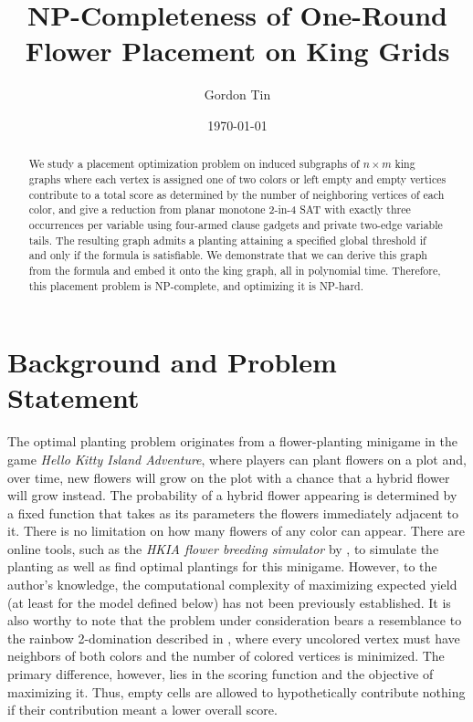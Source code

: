 \documentclass[11pt]{article}
\title{NP-Completeness of One-Round Flower Placement on King Grids}
\author{Gordon Tin}
\date{\today}
\theoremstyle{plain}
\begin{document}
\maketitle

\begin{abstract}
We study a placement optimization problem on induced subgraphs of $n \times m$ king graphs where each vertex is assigned one of two colors or left empty and empty vertices contribute to a total score as determined by the number of neighboring vertices of each color, and give a reduction from planar monotone 2-in-4 SAT with exactly three occurrences per variable using four-armed clause gadgets and private two-edge variable tails. The resulting graph admits a planting attaining a specified global threshold if and only if the formula is satisfiable. We demonstrate that we can derive this graph from the formula and embed it onto the king graph, all in polynomial time. Therefore, this placement problem is NP-complete, and optimizing it is NP-hard. 
\end{abstract}

\section{Background and Problem Statement} \label{sec:probstatement}

The optimal planting problem originates from a flower-planting minigame in the game \emph{Hello Kitty Island Adventure}, where players can plant flowers on a plot and, over time, new flowers will grow on the plot with a chance that a hybrid flower will grow instead. The probability of a hybrid flower appearing is determined by a fixed function that takes as its parameters the flowers immediately adjacent to it. There is no limitation on how many flowers of any color can appear. 
There are online tools, such as the \emph{HKIA flower breeding simulator} by \citet{auevi_hkia_flower}, to simulate the planting as well as find optimal plantings for this minigame. However, to the author's knowledge, the computational complexity of maximizing expected yield (at least for the model defined below) has not been previously established. It is also worthy to note that the problem under consideration bears a resemblance to the rainbow 2-domination described in \citet{BonomoEtAl2018}, where every uncolored vertex must have neighbors of both colors and the number of colored vertices is minimized. The primary difference, however, lies in the scoring function and the objective of maximizing it. Thus, empty cells are allowed to hypothetically contribute nothing if their contribution meant a lower overall score.
\end{document}
